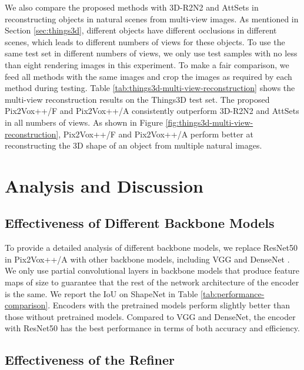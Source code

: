 \documentclass[twocolumn]{svjour3}
\begin{document}
We also compare the proposed methods with 3D-R2N2 \citep{DBLP:conf/eccv/ChoyXGCS16} and AttSets \citep{DBLP:journals/ijcv/YangSAN19} in reconstructing objects in natural scenes from multi-view images.
As mentioned in Section \ref{sec:things3d}, different objects have different occlusions in different scenes, which leads to different numbers of views for these objects.
To use the same test set in different numbers of views, we only use test samples with no less than eight rendering images in this experiment.
To make a fair comparison, we feed all methods with the same images and crop the images as required by each method during testing.
Table \ref{tab:things3d-multi-view-reconstruction} shows the multi-view reconstruction results on the Things3D test set.
The proposed Pix2Vox++/F and Pix2Vox++/A consistently outperform 3D-R2N2 and AttSets in all numbers of views.
As shown in Figure \ref{fig:things3d-multi-view-reconstruction}, Pix2Vox++/F and Pix2Vox++/A perform better at reconstructing the 3D shape of an object from multiple natural images.


\section{Analysis and Discussion}

\subsection{Effectiveness of Different Backbone Models}
 
To provide a detailed analysis of different backbone models, we replace ResNet50 in Pix2Vox++/A with other backbone models, including VGG \citep{DBLP:conf/iclr/SimonyanZ14a} and DenseNet \citep{DBLP:conf/cvpr/HuangLMW17}.
We only use partial convolutional layers in backbone models that produce feature maps of size  to guarantee that the rest of the network architecture of the encoder is the same.
We report the IoU on ShapeNet in Table \ref{tab:performance-comparison}.
Encoders with the pretrained models perform slightly better than those without pretrained models.
Compared to VGG and DenseNet, the encoder with ResNet50 has the best performance in terms of both accuracy and efficiency.

\subsection{Effectiveness of the Refiner}
\end{document}
